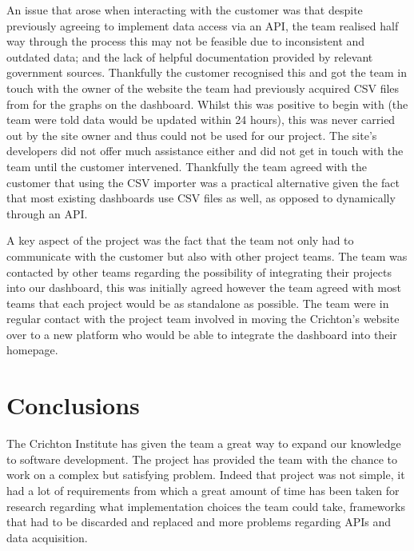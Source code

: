 \documentclass{l3proj}
\begin{document}
An issue that arose when interacting with the customer was that despite previously agreeing to implement data access via an API, the team realised half way through the process this may not be feasible due to inconsistent and outdated data; and the lack of helpful documentation provided by relevant government sources. Thankfully the customer recognised this and got the team in touch with the owner of the website the team had previously acquired CSV files from for the graphs on the dashboard. Whilst this was positive to begin with (the team were told data would be updated within 24 hours), this was never carried out by the site owner and thus could not be used for our project. The site's developers did not offer much assistance either and did not get in touch with the team until the customer intervened. Thankfully the team agreed with the customer that using the CSV importer was a practical alternative given the fact that most existing dashboards use CSV files as well, as opposed to dynamically through an API.

A key aspect of the project was the fact that the team not only had to communicate with the customer but also with other project teams. The team was contacted by other teams regarding the possibility of integrating their projects into our dashboard, this was initially agreed however the team agreed with most teams that each project would be as standalone as possible. The team were in regular contact with the project team involved in moving the Crichton's website over to a new platform who would be able to integrate the dashboard into their homepage.

\section{Conclusions}
\label{sec:conclusions}


The Crichton Institute has given the team a great way to expand our knowledge to software development. The project has provided the team with the chance to work on a complex but satisfying problem. Indeed that project was not simple, it had a lot of requirements from which a great amount of time has been taken for research regarding what implementation choices the team could take, frameworks that had to be discarded and replaced and more problems regarding APIs and data acquisition.
\end{document}
